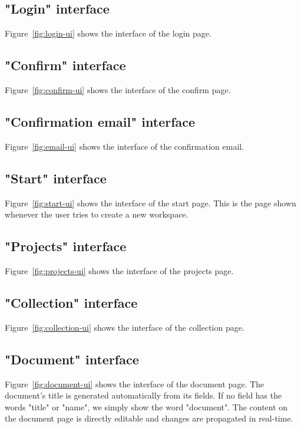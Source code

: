 \subsection{"Login" interface}
Figure~\ref{fig:login-ui} shows the interface of the login page.



\subsection{"Confirm" interface}
Figure~\ref{fig:confirm-ui} shows the interface of the confirm page.



\subsection{"Confirmation email" interface}
Figure~\ref{fig:email-ui} shows the interface of the confirmation email.



\subsection{"Start" interface}
Figure~\ref{fig:start-ui} shows the interface of the start page.
This is the page shown whenever the user tries to create a new workspace.



\subsection{"Projects" interface}
Figure~\ref{fig:projects-ui} shows the interface of the projects page.



\subsection{"Collection" interface}
Figure~\ref{fig:collection-ui} shows the interface of the collection page.



\subsection{"Document" interface}
Figure~\ref{fig:document-ui} shows the interface of the document page. The document's title is generated automatically from its fields. If no field has the words "title" or "name", we simply show the word "document".
The content on the document page is directly editable and changes are propagated in real-time.

